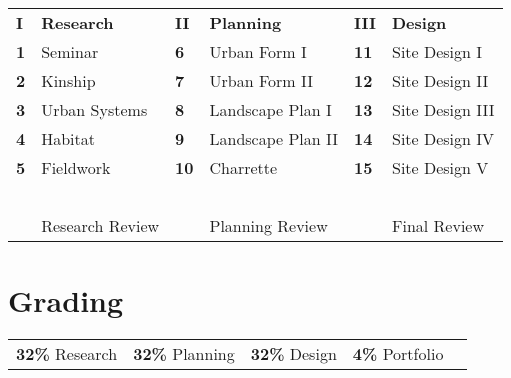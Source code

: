 \documentclass[11pt,article,oneside]{memoir}
\begin{document}
\begin{table}[H]
\begin{tabular}{l l l l l l}
% 
\textbf{I} & \textbf{Research}  \hspace{2em}
	& \textbf{II} & \textbf{Planning} \hspace{2em} 
	& \textbf{III} & \textbf{Design} \\
\textbf{1} & Seminar \hspace{2em}
	& \textbf{6} & Urban Form I \hspace{2em} 
	& \textbf{11} & Site Design I \\
\textbf{2} & Kinship \hspace{2em}
	& \textbf{7} & Urban Form II \hspace{2em} 
	& \textbf{12} & Site Design II \\
\textbf{3} & Urban Systems \hspace{2em}
	& \textbf{8} & Landscape Plan I \hspace{2em} 
	& \textbf{13} & Site Design III \\
\textbf{4} & Habitat \hspace{2em}
	& \textbf{9} & Landscape Plan II \hspace{2em} 
	& \textbf{14} & Site Design IV \\
\textbf{5} & Fieldwork \hspace{2em}
	& \textbf{10} & Charrette \hspace{2em} 
	& \textbf{15} & Site Design V\\
\textbf{\ } & \ \hspace{2em}
	& \textbf{\ } & \  \hspace{2em} 
	& \textbf{\ } & \  \\
\textbf{\ } & Research Review \hspace{2em}
	& \textbf{\ } & Planning Review \hspace{2em} 
	& \textbf{\ } & Final Review \\
\end{tabular}
\end{table}


\section{Grading}

\begin{table}[H]
\begin{tabular}{l @{\hskip 1cm} l @{\hskip 1cm} l @{\hskip 1cm} l @{\hskip 1cm} l}
\textbf{32\%} \enspace Research
& \textbf{32\%} \enspace Planning
& \textbf{32\%} \enspace Design
& \textbf{4\%} \quad Portfolio \\
\end{tabular}
\end{table}
\end{document}
